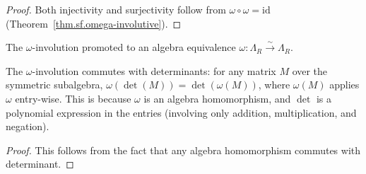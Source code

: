 \begin{proof}
\leanok
Both injectivity and surjectivity follow from $\omega \circ \omega = \mathrm{id}$
(Theorem~\ref{thm.sf.omega-involutive}).
\end{proof}

\begin{definition}
\label{def.sf.omega-equiv}
\leanhelper
\leanok
The $\omega$-involution promoted to an algebra equivalence
$\omega : \Lambda_R \xrightarrow{\sim} \Lambda_R$.
\end{definition}

\begin{lemma}
\label{lem.sf.omega-det-hsymm}
\leanhelper
\leanok
The $\omega$-involution commutes with determinants:
for any matrix $M$ over the symmetric subalgebra,
$\omega(\det(M)) = \det(\omega(M))$,
where $\omega(M)$ applies $\omega$ entry-wise.
This is because $\omega$ is an algebra homomorphism, and $\det$ is
a polynomial expression in the entries (involving only addition,
multiplication, and negation).
\end{lemma}

\begin{proof}
This follows from the fact that any algebra homomorphism
commutes with determinant.
\end{proof}
